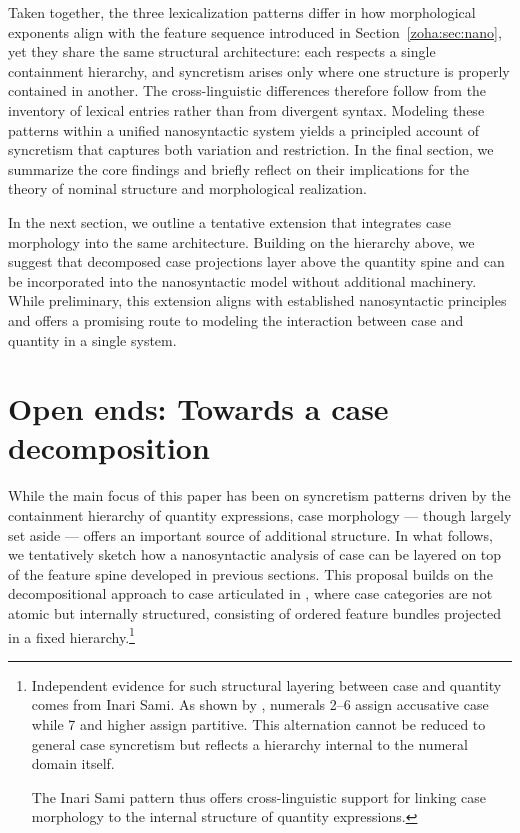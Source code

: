 \documentclass[output=paper,colorlinks,citecolor=brown
]{langscibook}
\begin{document}
\noindent Taken together, the three lexicalization patterns differ in how morphological exponents align with the feature sequence introduced in Section~\ref{zoha:sec:nano}, yet they share the same structural architecture: each respects a single containment hierarchy, and syncretism arises only where one structure is properly contained in another. The cross-linguistic differences therefore follow from the inventory of lexical entries rather than from divergent syntax. Modeling these patterns within a unified nanosyntactic system yields a principled account of syncretism that captures both variation and restriction. In the final section, we summarize the core findings and briefly reflect on their implications for the theory of nominal structure and morphological realization.

In the next section, we outline a tentative extension that integrates case morphology into the same architecture. Building on the hierarchy above, we suggest that decomposed case projections layer above the quantity spine and can be incorporated into the nanosyntactic model without additional machinery. While preliminary, this extension aligns with established nanosyntactic principles and offers a promising route to modeling the interaction between case and quantity in a single system.

\section{Open ends: Towards a case decomposition}\label{zoha:sec:open}

While the main focus of this paper has been on syncretism patterns driven by the containment hierarchy of quantity expressions, case morphology — though largely set aside — offers an important source of additional structure. In what follows, we tentatively sketch how a nanosyntactic analysis of case can be layered on top of the feature spine developed in previous sections. This proposal builds on the decompositional approach to case articulated in \citet{Caha2009}, where case categories are not atomic but internally structured, consisting of ordered feature bundles projected in a fixed hierarchy.\footnote{Independent evidence for such structural layering between case and quantity comes from Inari Sami. As shown by \citet{NelsonToivonen2000}, numerals 2--6 assign accusative case while 7 and higher assign partitive. This alternation cannot be reduced to general case syncretism but reflects a hierarchy internal to the numeral domain itself. 

The Inari Sami pattern thus offers cross-linguistic support for linking case morphology to the internal structure of quantity expressions.}
\end{document}
